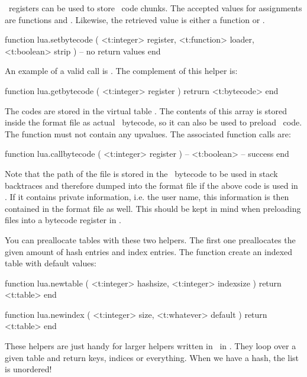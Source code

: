 \startsubsection[title=Bytecode registers]

\LUA\ registers can be used to store \LUA\ code chunks. The accepted values for
assignments are functions and . Likewise, the retrieved value is
either a function or .

\starttyping[option=LUA]
function lua.setbytecode (
    <t:integer>  register,
    <t:function> loader,
    <t:boolean>  strip
)
    -- no return values
end
\stoptyping

An example of a valid call is . The complement
of this helper is:

\starttyping[option=LUA]
function lua.getbytecode ( <t:integer> register )
    retrurn <t:bytecode>
end
\stoptyping

The codes are stored in the virtual table . The contents of
this array is stored inside the format file as actual \LUA\ bytecode, so it can
also be used to preload \LUA\ code. The function must not contain any upvalues.
The associated function calls are:

\starttyping[option=LUA]
function lua.callbytecode ( <t:integer> register )
    -- <t:boolean> -- success
end
\stoptyping

Note that the path of the file is stored in the \LUA\ bytecode to be used in
stack backtraces and therefore dumped into the format file if the above code is
used in \INITEX. If it contains private information, i.e. the user name, this
information is then contained in the format file as well. This should be kept in
mind when preloading files into a bytecode register in \INITEX.

\stopsubsection

\startsubsection[title=Tables]

You can preallocate tables with these two helpers. The first one preallocates the
given amount of hash entries and index entries. The  function
create an indexed table with default values:

\starttyping[option=LUA]
function lua.newtable ( <t:integer> hashsize, <t:integer> indexsize )
    return <t:table>
end

function lua.newindex ( <t:integer> size, <t:whatever> default )
    return <t:table>
end
\stoptyping

These helpers are just handy for larger helpers written in \LUA\ in \CONTEXT.
They loop over a given table and return keys, indices or everything. When we have
a hash, the list is unordered!

